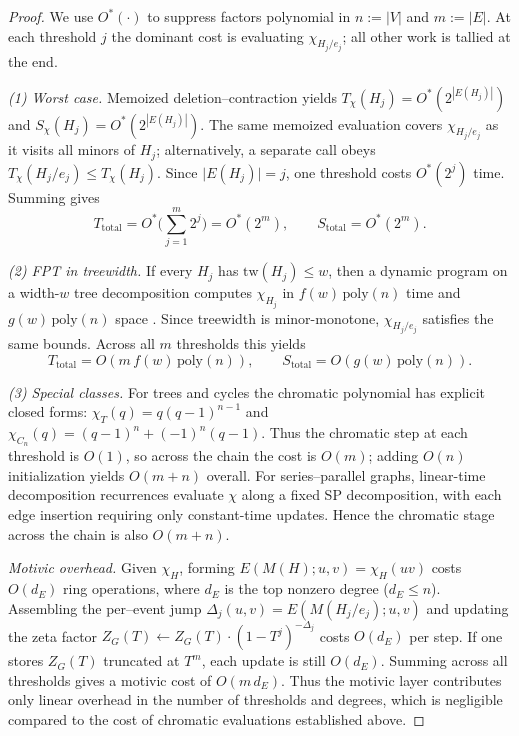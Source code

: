 \documentclass[runningheads]{llncs}
\begin{document}
\begin{proof}
We use $O^\ast(\cdot)$ to suppress factors polynomial in $n:=|V|$ and $m:=|E|$.
At each threshold $j$ the dominant cost is evaluating $\chi_{H_j/e_j}$; 
all other work is tallied at the end.


\medskip\noindent\emph{(1) Worst case.}
Memoized deletion--contraction yields
$T_\chi(H_j)=O^\ast(2^{|E(H_j)|})$ and $S_\chi(H_j)=O^\ast(2^{|E(H_j)|})$.
The same memoized evaluation covers $\chi_{H_j/e_j}$ as it visits all minors of $H_j$;
alternatively, a separate call obeys $T_\chi(H_j/e_j)\le T_\chi(H_j)$.
Since $\lvert E(H_j)\rvert=j$, one threshold costs $O^\ast(2^j)$ time. 
Summing gives
\[
T_{\mathrm{total}}
  = O^\ast\!\Big(\sum_{j=1}^{m} 2^j\Big)
  = O^\ast(2^m),
\qquad
S_{\mathrm{total}} = O^\ast(2^m).
\]

\medskip\noindent\emph{(2) FPT in treewidth.}
If every $H_j$ has $\mathrm{tw}(H_j)\le w$, then a dynamic program on a 
width-$w$ tree decomposition computes $\chi_{H_j}$ in 
$f(w)\,\mathrm{poly}(n)$ time and $g(w)\,\mathrm{poly}(n)$ space 
\cite{Noble1998,Cygan2015}. Since treewidth is minor-monotone, 
$\chi_{H_j/e_j}$ satisfies the same bounds. 
Across all $m$ thresholds this yields
\[
T_{\mathrm{total}}=O(m\, f(w)\,\mathrm{poly}(n)), \qquad
S_{\mathrm{total}}=O(g(w)\,\mathrm{poly}(n)).
\]

\medskip\noindent\emph{(3) Special classes.}
For trees and cycles the chromatic polynomial has explicit closed forms:
$\chi_T(q)=q(q-1)^{n-1}$ and
$\chi_{C_n}(q)=(q-1)^n+(-1)^n(q-1)$.
Thus the chromatic step at each threshold is $O(1)$, so across the chain the cost
is $O(m)$; adding $O(n)$ initialization yields $O(m+n)$ overall.
For series--parallel graphs, linear-time decomposition recurrences evaluate
$\chi$ along a fixed SP decomposition, with each edge insertion requiring only
constant-time updates. Hence the chromatic stage across the chain is also
$O(m+n)$.

\medskip\noindent\emph{Motivic overhead.}
Given $\chi_H$, forming
$E(M(H);u,v)=\chi_H(uv)$ 
costs $O(d_E)$ ring operations, where $d_E$ is the
top nonzero degree ($d_E\le n$).
Assembling the per–event jump $\Delta_j(u,v)=E(M(H_j/e_j);u,v)$ and
updating the zeta factor $Z_G(T)\gets Z_G(T)\cdot (1-T^j)^{-\Delta_j}$ costs $O(d_E)$ per step.
If one stores $Z_G(T)$ truncated at $T^{m}$, each update is still $O(d_E)$.
Summing across all thresholds gives a motivic cost of $O(m\,d_E)$.
Thus the motivic layer contributes only linear overhead in the
number of thresholds and degrees, which is negligible compared to the cost of
chromatic evaluations established above.
\end{proof}
\end{document}
